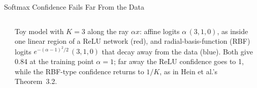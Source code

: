 \begin{frame}{Softmax Confidence Fails Far From the Data}
\begin{columns}[T,onlytextwidth]
{}\\[0.3em]
      {\scriptsize Toy model with $K=3$ along the ray $\alpha x$: affine logits $\alpha\,(3,1,0)$, as inside one linear region of a ReLU network (red), and radial-basis-function (RBF) logits $e^{-(\alpha-1)^2/2}\,(3,1,0)$ that decay away from the data (blue). Both give 0.84 at the training point $\alpha=1$; far away the ReLU confidence goes to 1, while the RBF-type confidence returns to $1/K$, as in Hein et al.'s Theorem~3.2.\par}
  \end{columns}
\end{frame}

